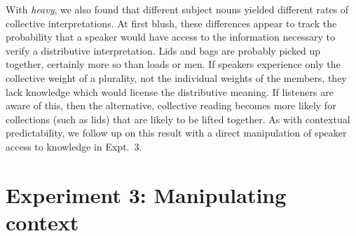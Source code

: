 \documentclass[preprint,12pt,authoryear,titlepage]{elsarticle}
\begin{document}
With \emph{heavy}, we also found that different subject nouns yielded different rates of collective interpretations. At first blush, these differences appear to track the probability that a speaker would have access to the information necessary to verify a distributive interpretation. Lids and bags are probably picked up together, certainly more so than loads or men. 
If speakers experience only the collective weight of a plurality, not the individual weights of the members, they lack knowledge which would license the distributive meaning. 
If listeners are aware of this, then the alternative, collective reading becomes more likely for collections (such as lids) that are likely to be lifted together.
As with contextual predictability, we follow up on this result with a direct manipulation of speaker access to knowledge in Expt.~3.


\section{Experiment 3: Manipulating context}
\end{document}
